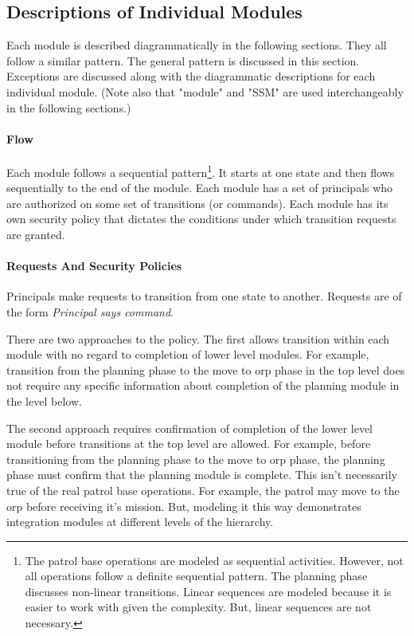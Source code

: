 \documentclass[../../main/main.tex]{subfiles}
\begin{document}
\subsection{Descriptions of Individual Modules}
Each module is described diagrammatically in the following sections.  They all follow a similar pattern.  The general pattern is discussed in this section.  Exceptions are discussed along with the diagrammatic descriptions for each individual module. (Note also that "module" and "SSM" are used interchangeably in the following sections.)

\paragraph*{Flow}
Each module follows a sequential pattern\footnote{The patrol base operations are modeled as sequential activities.  However, not all operations follow a definite sequential pattern.  The planning phase discusses non-linear transitions.  Linear sequences are modeled because it is easier to work with given the complexity.  But, linear sequences are not necessary.}.  It starts at one state and then flows sequentially to the end of the module. Each module has a set of principals who are authorized on some set of transitions (or commands).  Each module has its own security policy that dictates the conditions under which transition requests are granted.  

\paragraph*{Requests And Security Policies}
Principals make requests to transition from one state to another.  Requests are of the form \textit{Principal says command}.  

There are two approaches to the policy.  The first allows transition within each module with no regard to completion of lower level modules.  For example, transition from the planning phase to the move to \gls{orp} phase in the top level does not require any specific information about completion of the planning module in the level below.

The second approach requires confirmation of completion of the lower level module before transitions at the top level are allowed.  For example, before transitioning from the planning phase to the move to \gls{orp} phase, the planning phase must confirm that the planning module is complete.   This isn't necessarily true of the real patrol base operations.  For example, the patrol may move to the \gls{orp} before receiving it's mission.  But, modeling it this way demonstrates integration modules at different levels of the hierarchy. 
\end{document}
